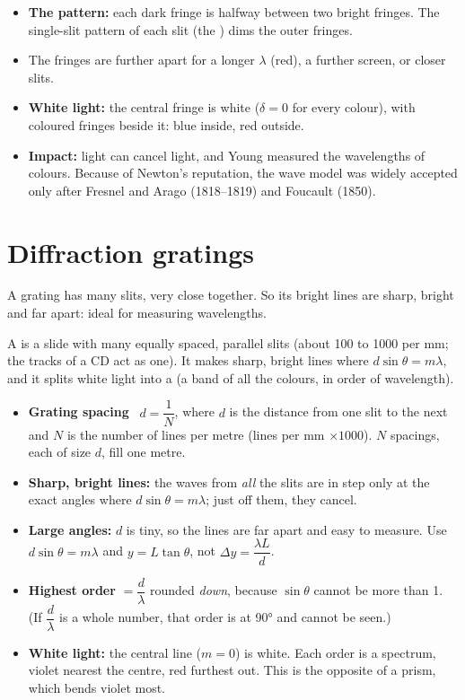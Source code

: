 \begin{itemize}
  \item \textbf{The pattern:} each dark fringe is halfway between two bright fringes. The
        single-slit pattern of each slit (the ) dims the outer fringes.
  \item The fringes are further apart for a longer $\lambda$ (red), a further screen, or
        closer slits.
  \item \textbf{White light:} the central fringe is white ($\delta = 0$ for every colour),
        with coloured fringes beside it: blue inside, red outside.
  \item \textbf{Impact:} light can cancel light, and Young measured the wavelengths of
        colours. Because of Newton's reputation, the wave model was widely accepted only
        after Fresnel and Arago (1818--1819) and Foucault (1850).
\end{itemize}

\section{Diffraction gratings}\label{ch2:sec:gratings}

\begin{bigidea}
A grating has many slits, very close together. So its bright lines are sharp, bright and
far apart: ideal for measuring wavelengths.
\end{bigidea}

A  is a slide with many equally spaced, parallel slits (about 100
to 1000 per mm; the tracks of a CD act as one). It makes sharp, bright lines where
$d\sin\theta = m\lambda$, and it splits white light into a  (a band of all
the colours, in order of wavelength).

\begin{itemize}
  \item \textbf{Grating spacing} \hscbadgenotonsheet\ $d = \dfrac{1}{N}$, where $d$ is the
        distance from one slit to the next and $N$ is the number of lines per metre (lines
        per mm $\times 1000$). $N$ spacings, each of size $d$, fill one metre.
  \item \textbf{Sharp, bright lines:} the waves from \emph{all} the slits are in step only
        at the exact angles where $d\sin\theta = m\lambda$; just off them, they cancel.
  \item \textbf{Large angles:} $d$ is tiny, so the lines are far apart and easy to measure.
        Use $d\sin\theta = m\lambda$ and $y = L\tan\theta$, not $\Delta y = \dfrac{\lambda L}{d}$.
  \item \textbf{Highest order} $= \dfrac{d}{\lambda}$ rounded \emph{down}, because
        $\sin\theta$ cannot be more than 1. (If $\dfrac{d}{\lambda}$ is a whole number,
        that order is at \ang{90} and cannot be seen.)
  \item \textbf{White light:} the central line ($m = 0$) is white. Each order is a spectrum,
        violet nearest the centre, red furthest out. This is the opposite of a prism, which
        bends violet most.
\end{itemize}

